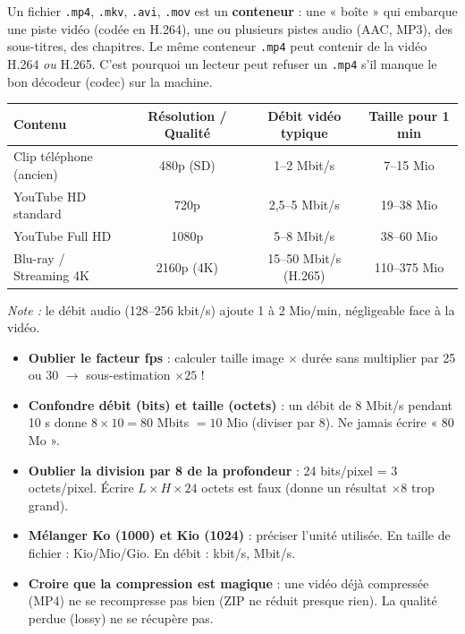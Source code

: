 \documentclass[11pt]{article}
\begin{document}
\begin{savaistu}
Un fichier \texttt{.mp4}, \texttt{.mkv}, \texttt{.avi}, \texttt{.mov} est un \textbf{conteneur} : une « boîte » qui embarque une piste vidéo (codée en H.264), une ou plusieurs pistes audio (AAC, MP3), des sous-titres, des chapitres. Le même conteneur \texttt{.mp4} peut contenir de la vidéo H.264 \emph{ou} H.265. C'est pourquoi un lecteur peut refuser un \texttt{.mp4} s'il manque le bon décodeur (codec) sur la machine.
\end{savaistu}

\begin{exemplebox}
\begin{center}
\begin{tabular}{|l|c|c|c|}
\hline
\rowcolor{popblueL} \textbf{Contenu} & \textbf{Résolution / Qualité} & \textbf{Débit vidéo typique} & \textbf{Taille pour 1 min} \\
\hline
Clip téléphone (ancien) & 480p (SD) & 1--2 Mbit/s & 7--15 Mio \\
\hline
YouTube HD standard & 720p & 2,5--5 Mbit/s & 19--38 Mio \\
\hline
YouTube Full HD & 1080p & 5--8 Mbit/s & 38--60 Mio \\
\hline
Blu-ray / Streaming 4K & 2160p (4K) & 15--50 Mbit/s (H.265) & 110--375 Mio \\
\hline
\end{tabular}
\end{center}
\emph{Note :} le débit audio (128--256 kbit/s) ajoute 1 à 2 Mio/min, négligeable face à la vidéo.
\end{exemplebox}

\begin{attention}
\begin{itemize}
  \item \textbf{Oublier le facteur fps} : calculer taille image $\times$ durée sans multiplier par 25 ou 30 $\rightarrow$ sous-estimation $\times 25$ !
  \item \textbf{Confondre débit (bits) et taille (octets)} : un débit de 8 Mbit/s pendant 10 s donne $8 \times 10 = 80$ Mbits $= 10$ Mio (diviser par 8). Ne jamais écrire « 80 Mo ».
  \item \textbf{Oublier la division par 8 de la profondeur} : 24 bits/pixel = 3 octets/pixel. Écrire $L \times H \times 24$ octets est faux (donne un résultat $\times 8$ trop grand).
  \item \textbf{Mélanger Ko (1000) et Kio (1024)} : préciser l'unité utilisée. En taille de fichier : Kio/Mio/Gio. En débit : kbit/s, Mbit/s.
  \item \textbf{Croire que la compression est magique} : une vidéo déjà compressée (MP4) ne se recompresse pas bien (ZIP ne réduit presque rien). La qualité perdue (lossy) ne se récupère pas.
\end{itemize}
\end{attention}
\end{document}

